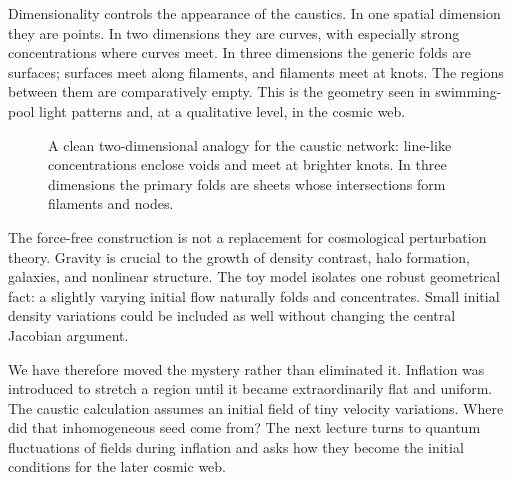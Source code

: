 Dimensionality controls the appearance of the caustics. In one spatial dimension they are points. In two dimensions they are curves, with especially strong concentrations where curves meet. In three dimensions the generic folds are surfaces; surfaces meet along filaments, and filaments meet at knots. The regions between them are comparatively empty. This is the geometry seen in swimming-pool light patterns and, at a qualitative level, in the cosmic web.

\begin{figure}[htbp]
\centering
{}
\caption{A clean two-dimensional analogy for the caustic network: line-like concentrations enclose voids and meet at brighter knots. In three dimensions the primary folds are sheets whose intersections form filaments and nodes.}
\label{fig:c09-caustic-network}
\end{figure}

The force-free construction is not a replacement for cosmological perturbation theory. Gravity is crucial to the growth of density contrast, halo formation, galaxies, and nonlinear structure. The toy model isolates one robust geometrical fact: a slightly varying initial flow naturally folds and concentrates. Small initial density variations could be included as well without changing the central Jacobian argument.

We have therefore moved the mystery rather than eliminated it. Inflation was introduced to stretch a region until it became extraordinarily flat and uniform. The caustic calculation assumes an initial field of tiny velocity variations. Where did that inhomogeneous seed come from? The next lecture turns to quantum fluctuations of fields during inflation and asks how they become the initial conditions for the later cosmic web.


